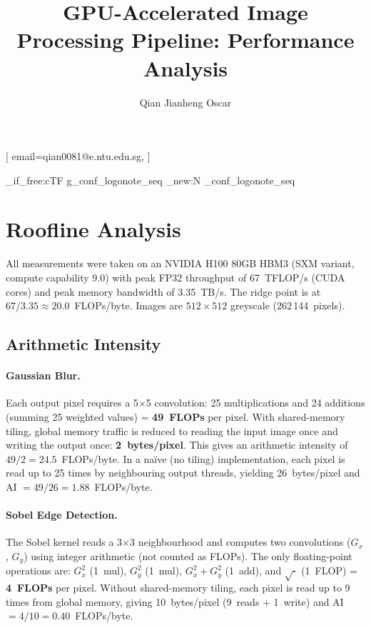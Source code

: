 \documentclass[
hf,
]{confart}
\begin{document}
\copyrightclause{}

\title{GPU-Accelerated Image Processing Pipeline: Performance Analysis}

\author[1]{Qian Jianheng Oscar}[%
email=qian0081@e.ntu.edu.sg,
]

\address[1]{Nanyang Technological University, Singapore}

\ExplSyntaxOn
\cs_if_free:cTF { g_conf_logonote_seq } { \seq_new:N \g_conf_logonote_seq } { }
\ExplSyntaxOff

\maketitle

\section{Roofline Analysis}
\label{sec:roofline}

All measurements were taken on an NVIDIA H100 80GB HBM3 (SXM variant, compute capability 9.0) with peak FP32 throughput of 67~TFLOP/s (CUDA cores) and peak memory bandwidth of 3.35~TB/s. The ridge point is at $67 / 3.35 \approx 20.0$~FLOPs/byte. Images are $512 \times 512$ greyscale (262\,144~pixels).

\subsection{Arithmetic Intensity}

\paragraph{Gaussian Blur.}
Each output pixel requires a 5$\times$5 convolution: 25 multiplications and 24 additions (summing 25 weighted values) = \textbf{49~FLOPs} per pixel. With shared-memory tiling, global memory traffic is reduced to reading the input image once and writing the output once: \textbf{2~bytes/pixel}. This gives an arithmetic intensity of $49 / 2 = \mathbf{24.5}$~FLOPs/byte. In a na\"ive (no tiling) implementation, each pixel is read up to 25 times by neighbouring output threads, yielding 26~bytes/pixel and AI $= 49/26 = 1.88$~FLOPs/byte.

\paragraph{Sobel Edge Detection.}
The Sobel kernel reads a 3$\times$3 neighbourhood and computes two convolutions ($G_x$, $G_y$) using integer arithmetic (not counted as FLOPs). The only floating-point operations are: $G_x^2$ (1~mul), $G_y^2$ (1~mul), $G_x^2 + G_y^2$ (1~add), and $\sqrt{\cdot}$ (1~FLOP) = \textbf{4~FLOPs} per pixel. Without shared-memory tiling, each pixel is read up to 9 times from global memory, giving 10~bytes/pixel (9~reads + 1~write) and AI $= 4/10 = \mathbf{0.40}$~FLOPs/byte.
\end{document}
